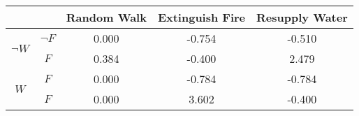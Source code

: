 \begin{center}
\begin{tabular}{|c|c|c|c|c|}
  \hline
  &   & Random Walk & Extinguish Fire & Resupply Water\\
  \hline
  \multirow{2}{*}{$\neg W$} & $\neg F$ & 0.000 & -0.754 & -0.510\\
  \cline{2-5}
   & $F$ & 0.384 & -0.400 & 2.479\\
  \hline
  \multirow{2}{*}{$W$} & $F$ & 0.000 & -0.784 & -0.784\\
  \cline{2-5}
   & $F$ & 0.000 & 3.602 & -0.400\\
  \hline
\end{tabular}
\end{center}
